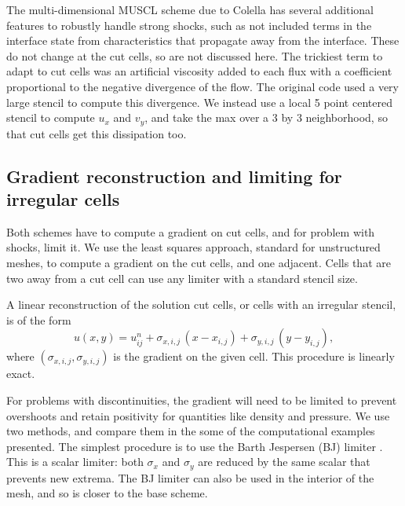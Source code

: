 The multi-dimensional MUSCL scheme due to Colella has several additional
features to robustly handle strong shocks, such as not included terms in the
interface state from characteristics that propagate away from the interface. These
do not change at the cut cells, so are not discussed here.  The
trickiest  term to adapt to cut cells was an artificial viscosity 
added to each flux with a
coefficient proportional to the negative divergence of the flow.  The original
code used a very large stencil to compute this divergence. We instead use a local 5
point centered stencil to compute $u_x$ and $v_y$, and take the max over a 3 by 3
neighborhood, so that cut cells get this dissipation too.

\subsection{Gradient reconstruction and limiting for irregular cells}
Both schemes have to compute a gradient on cut cells, and for
problem with shocks, limit it. 
We use the least squares approach, standard for unstructured meshes,
to compute a gradient on the cut cells, and one adjacent.
Cells that are two away from a cut cell
can use any limiter with a standard stencil size. 

A linear reconstruction of the solution cut cells, or cells with an 
irregular stencil, is of the form
\begin{equation}
u(x,y) = u_{ij}^n + \sigma_{x,i,j} \,(x-x_{i,j}) +
                     \sigma_{y,i,j}\,(y-y_{i,j}),
\label{eqn:lls}
\end{equation}
where $(\sigma_{x,i,j},\sigma_{y,i,j})$ is the gradient on the given
cell. This procedure is linearly exact.  

For problems with discontinuities, the gradient will need to be limited
to prevent overshoots and retain positivity for quantities like density and
pressure.
We use two methods, and compare them in the some of the 
computational examples presented.
The simplest procedure  is to use the Barth Jespersen (BJ) limiter \cite{}. 
This is a scalar limiter: both $\sigma_x$ and $\sigma_y$ are reduced by
the same scalar that prevents new extrema.  The BJ limiter  can also be
used in the interior of the mesh, and so is closer to the base scheme. 

